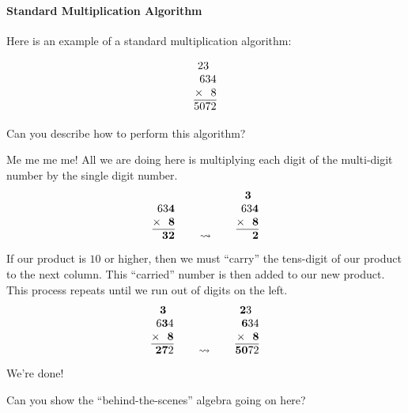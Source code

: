 \paragraph{Standard Multiplication Algorithm}
Here is an example of a standard multiplication algorithm:

\[
\begin{array}{@{}r@{}}
23~~\\
634\\
\times~~8\\ \hline
5072
\end{array}
\]

\begin{question}
Can you describe how to perform this algorithm?
\end{question}

Me me me me! All we are doing here is multiplying each digit of the
multi-digit number by the single digit number.
\[
\begin{array}[b]{@{}r@{}}
63\textbf{4}\\
\times~~\textbf{8}\\ \hline
~~\textbf{32}
\end{array}
\qquad
\leadsto
\qquad
\begin{array}[b]{@{}r@{}}
\textbf{3}~~\\
63\textbf{4}\\
\times~~\textbf{8}\\ \hline
~~~\textbf{2}
\end{array}
\]
If our product is $10$ or higher, then we must ``carry'' the
tens-digit of our product to the next column. This ``carried'' number
is then added to our new product. This process repeats until we run
out of digits on the left.
\[
\begin{array}[b]{@{}r@{}}
\textbf{3}~~\\
6\textbf{3}4\\
\times~~\textbf{8}\\ \hline
~\textbf{27}2
\end{array}
\qquad
\leadsto
\qquad
\begin{array}[b]{@{}r@{}}
\textbf{2}3~~\\
\textbf{6}34\\
\times~~\textbf{8}\\ \hline
\textbf{50}72
\end{array}
\]
We're done!

\begin{question}
Can you show the ``behind-the-scenes'' algebra going on here?
\end{question}

